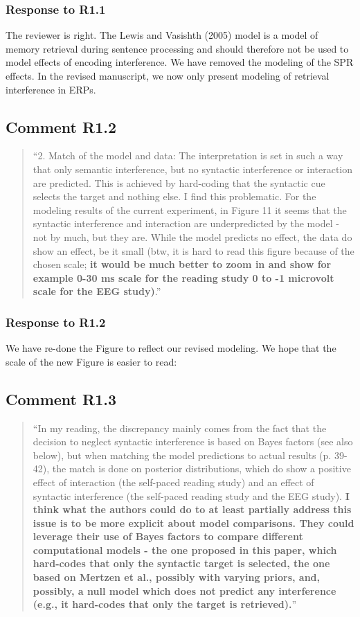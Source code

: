 \documentclass[12pt]{article}
\begin{document}
\subsubsection*{Response to R1.1}
The reviewer is right. The Lewis and Vasishth (2005) model is a model of memory retrieval during sentence processing and should therefore not be used to model effects of encoding interference. We have removed the modeling of the SPR effects. In the revised manuscript, we now only present modeling of retrieval interference in ERPs. 

\subsection*{Comment R1.2}
\begin{quote}
``2. Match of the model and data: The interpretation is set in such a way that only semantic interference, but no syntactic interference or interaction are predicted. This is achieved by hard-coding that the syntactic cue selects the target and nothing else. I find this problematic. For the modeling results of the current experiment, in Figure 11 it seems that the syntactic interference and interaction are underpredicted by the model - not by much, but they are. While the model predicts no effect, the data do show an effect, be it small (btw, it is hard to read this figure because of the chosen scale; \textbf{it would be much better to zoom in and show for example 0-30 ms scale for the reading study 0 to -1 microvolt scale for the EEG study)}.''\end{quote}

\subsubsection*{Response to R1.2}
We have re-done the Figure to reflect our revised modeling. We hope that the scale of the new Figure is easier to read:



\subsection*{Comment R1.3}
\begin{quote}
``In my reading, the discrepancy mainly comes from the fact that the decision to neglect syntactic interference is based on Bayes factors (see also below), but when matching the model predictions to actual results (p. 39-42), the match is done on posterior distributions, which do show a positive effect of interaction (the self-paced reading study) and an effect of syntactic interference (the self-paced reading study and the EEG study). \textbf{I think what the authors could do to at least partially address this issue is to be more explicit about model comparisons. They could leverage their use of Bayes factors to compare different computational models - the one proposed in this paper, which hard-codes that only the syntactic target is selected, the one based on Mertzen et al., possibly with varying priors, and, possibly, a null model which does not predict any interference (e.g., it hard-codes that only the target is retrieved).}''\end{quote}
\end{document}

